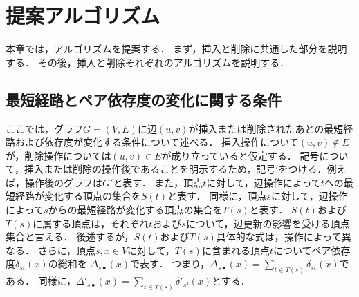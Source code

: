 \chapter{提案アルゴリズム}
\label{chap:algorithm}

本章では，アルゴリズムを提案する．
まず，挿入と削除に共通した部分を説明する．
その後，挿入と削除それぞれのアルゴリズムを説明する．

\section{最短経路とペア依存度の変化に関する条件}
\label{sect:condition-of-variability}

ここでは，グラフ$G=(V,E)$に辺$(u,v)$が挿入または削除されたあとの最短経路および依存度が変化する条件について述べる．
挿入操作について$(u,v)\notin E$が，削除操作については$(u,v)\in E$が成り立っていると仮定する．
記号について，挿入または削除の操作後であることを明示するため，記号$'$をつける．例えば，操作後のグラフは$G'$と表す．
また，頂点$t$に対して，辺操作によって$t$への最短経路が変化する頂点の集合を$S(t)$と表す．
同様に，頂点$s$に対して，辺操作によって$s$からの最短経路が変化する頂点の集合を$T(s)$と表す．
$S(t)$および$T(s)$に属する頂点は，それぞれ$t$および$s$について，辺更新の影響を受ける頂点集合と言える．
後述するが，$S(t)$および$T(s)$具体的な式は，操作によって異なる．
さらに，頂点$s,x\in V$に対して，$T(s)$に含まれる頂点$t$についてペア依存度$\delta_{st}(x)$の総和を
$\Delta_{s\bullet}(x)$で表す\cite{Bergamini2017}．
つまり，$\Delta_{s\bullet}(x)=\sum_{t\in T(s)}\delta_{st}(x)$である．
同様に，$\Delta'_{s\bullet}(x)=\sum_{t\in T(s)}\delta'_{st}(x)$とする．

